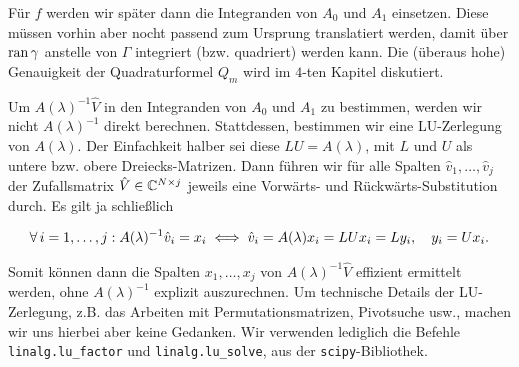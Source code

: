 Für $f$ werden wir später dann die Integranden von $A_0$ und $A_1$ einsetzen.
Diese müssen vorhin aber nocht passend zum Ursprung translatiert werden, damit über $\operatorname{ran} \gamma$ anstelle von $\Gamma$ integriert (bzw. quadriert) werden kann.
Die (überaus hohe) Genauigkeit der Quadraturformel $Q_m$ wird im $4$-ten Kapitel diskutiert.

Um $A(\lambda)^{-1} \hat V$ in den Integranden von $A_0$ und $A_1$ zu bestimmen, werden wir nicht $A(\lambda)^{-1}$ direkt berechnen.
Stattdessen, bestimmen wir eine LU-Zerlegung von $A(\lambda)$.
Der Einfachkeit halber sei diese $L U = A(\lambda)$, mit $L$ und $U$ als untere bzw. obere Dreiecks-Matrizen.
Dann führen wir für alle Spalten $\hat v_1, \dots, \hat v_j$ der Zufallsmatrix $\hat V \in \mathbb{C}^{N \times j}$ jeweils eine Vorwärts- und Rückwärts-Substitution durch.
Es gilt ja schließlich

\begin{align*}
    \forall \, i = 1, \dots, j:
        A(\lambda)^{-1} \hat v_i = x_i
        \iff
        \hat v_i = A(\lambda) x_i = L U x_i = L y_i,
        \quad
        y_i = U x_i.
\end{align*}

Somit können dann die Spalten $x_1, \dots, x_j$ von $A(\lambda)^{-1} \hat V$ effizient ermittelt werden, ohne $A(\lambda)^{-1}$ explizit auszurechnen.
Um technische Details der LU-Zerlegung, z.B. das Arbeiten mit Permutationsmatrizen, Pivotsuche usw., machen wir uns hierbei aber keine Gedanken.
Wir verwenden lediglich die Befehle \texttt{linalg.lu\_factor} und \texttt{linalg.lu\_solve}, aus der \texttt{scipy}-Bibliothek.

